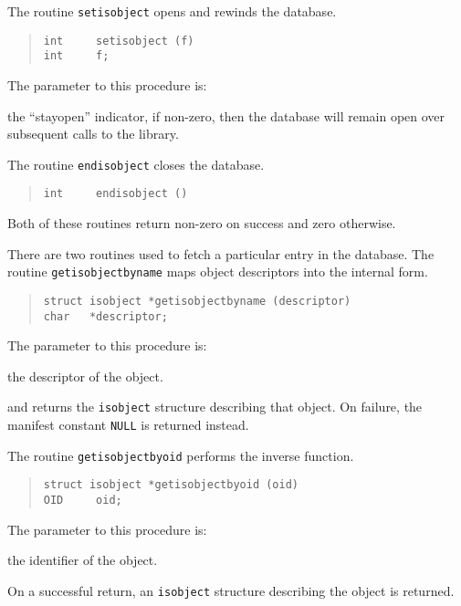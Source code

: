 The routine \verb"setisobject" opens and rewinds the database.
\begin{quote}\small\begin{verbatim}
int     setisobject (f)
int     f;
\end{verbatim}\end{quote}
The parameter to this procedure is:
\begin{describe}
\item[\verb"f":] the ``stayopen'' indicator,
if non-zero, then the database will remain open over subsequent calls to the
library.
\end{describe}
The routine \verb"endisobject" closes the database.
\begin{quote}\small\begin{verbatim}
int     endisobject ()
\end{verbatim}\end{quote}
Both of these routines return non-zero on success and zero otherwise.

There are two routines used to fetch a particular entry in the database.
The routine \verb"getisobjectbyname" maps object descriptors into
the internal form.
\begin{quote}\small\begin{verbatim}
struct isobject *getisobjectbyname (descriptor)
char   *descriptor;
\end{verbatim}\end{quote}
The parameter to this procedure is:
\begin{describe}
\item[\verb"descriptor":] the descriptor of the object.
\end{describe}
and returns the \verb"isobject" structure describing that object.
On failure, the manifest constant \verb"NULL" is returned instead.

The routine \verb"getisobjectbyoid" performs the inverse function.
\begin{quote}\small\begin{verbatim}
struct isobject *getisobjectbyoid (oid)
OID     oid;
\end{verbatim}\end{quote}
The parameter to this procedure is:
\begin{describe}
\item[\verb"oid":] the identifier of the object.
\end{describe}
On a successful return,
an \verb"isobject" structure describing the object is returned.
